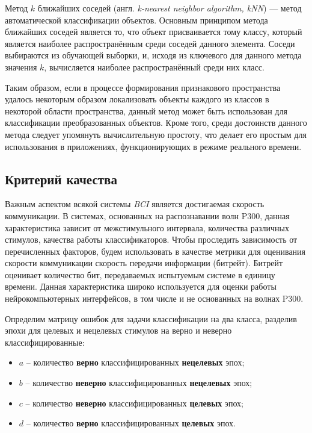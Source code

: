 \documentclass[12pt,a4paper,oneside,fleqn,leqno]{article}
\begin{document}
	\par Метод $k$ ближайших соседей (англ. {\it k-nearest neighbor algorithm, kNN}) — метод автоматической классификации объектов. Основным принципом метода ближайших соседей является то, что объект присваивается тому классу, который является наиболее распространённым среди соседей данного элемента. Соседи выбираются из обучающей выборки, и, исходя из ключевого для данного метода значения $k$, вычисляется наиболее распространённый среди них класс.
	\par Таким образом, если в процессе формирования признакового пространства удалось некоторым образом локализовать объекты каждого из классов в некоторой области пространства, данный метод может быть использован для классификации преобразованных объектов. Кроме того, среди достоинств данного метода следует упомянуть вычислительную простоту, что делает его простым для использования в приложениях, функционирующих в режиме реального времени.

	\subsection{Критерий качества}
	\par Важным аспектом всякой системы {\it BCI} является достигаемая скорость коммуникации. В системах, основанных на распознавании волн P300, данная характеристика зависит от межстимульного интервала, количества различных стимулов, качества работы классификаторов. Чтобы проследить зависимость от перечисленных факторов, будем использовать в качестве метрики для оценивания скорости коммуникации скорость передачи информации (битрейт). Битрейт оценивает количество бит, передаваемых испытуемым системе в единицу времени. Данная характеристика широко используется для оценки работы нейрокомпьютерных интерфейсов, в том числе и не основанных на волнах P300.
	\par Определим матрицу ошибок для задачи классификации на два класса, разделив эпохи для целевых и нецелевых стимулов на верно и неверно классифицированные:
	\begin{itemize}\itemsep-4pt
	\item
	$a$ -- количество {\bf верно} классифицированных {\bf нецелевых} эпох;
	\item
	$b$ -- количество {\bf неверно} классифицированных {\bf нецелевых} эпох;
	\item
	$c$ -- количество {\bf неверно} классифицированных {\bf целевых} эпох;
	\item
	$d$ -- количество {\bf верно} классифицированных {\bf целевых} эпох.
	\end{itemize}
\end{document}
